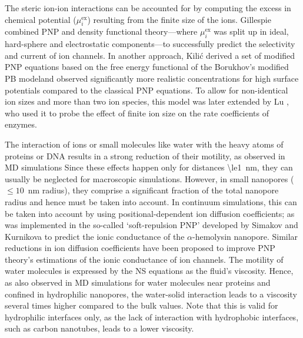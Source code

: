 \documentclass[journal=ancac3,manuscript=article,etalmode=truncate,maxauthors=0,layout=onecolumn]{achemso}
\begin{document}
The steric ion-ion interactions can be accounted for by computing the excess in
chemical potential ($\mu_{i}^\text{ex}$) resulting from the finite size of the
ions.\cite{Eisenberg-1996,Bazant-2009, Daiguji-2010} Gillespie \etal{} combined
PNP and density functional theory---where $\mu_{i}^\text{ex}$ was split up in
ideal, hard-sphere and electrostatic components---to successfully predict the
selectivity and current of ion channels.\cite{Gillespie-2002} In another
approach, Kili\'{c} \etal{} derived a set of modified PNP equations based on the
free energy functional of the Borukhov's modified PB
model\cite{Borukhov-1997}and observed significantly more realistic
concentrations for high surface potentials compared to the classical PNP
equations.\cite{Kilic-2007} To allow for non-identical ion sizes and more than
two ion species, this model was later extended by Lu \etal{}, who used it to
probe the effect of finite ion size on the rate coefficients of
enzymes.\cite{Lu-2011}

The interaction of ions or small molecules like water with the heavy atoms of
proteins or DNA results in a strong reduction of their motility, as observed in
MD simulations\cite{Makarov-1998,Pronk-2014} Since these effects happen only for
distances \SI{\le1}{\nm}, they can usually be neglected for macroscopic
simulations. However, in small nanopores ($\le10$~nm radius), they comprise a
significant fraction of the total nanopore radius and hence must be taken into
account.\cite{Noskov-2004,Simakov-2010,Pederson-2015,McMullen-2017} In continuum
simulations, this can be taken into account by using positional-dependent ion
diffusion coefficients; as was implemented in the so-called `soft-repulsion PNP'
developed by Simakov and Kurnikova\cite{Simakov-2010, Simakov-2018} to predict
the ionic conductance of the $\alpha$-hemolysin nanopore. Similar reductions in
ion diffusion coefficients have been proposed to improve PNP theory's
estimations of the ionic conductance of ion channels.\cite{Furini-2006,Liu-2015}
The motility of water molecules is expressed by the NS equations as the fluid's
viscosity. Hence, as also observed in MD simulations for water molecules near
proteins\cite{Pronk-2014} and confined in hydrophilic
nanopores,\cite{Qiao_Aluru-2003,Vo-2016,Hsu-2017} the water-solid interaction
leads to a viscosity several times higher compared to the bulk values. Note that
this is valid for hydrophilic interfaces only, as the lack of interaction with
hydrophobic interfaces, such as carbon nanotubes, leads to a lower
viscosity.\cite{Ye-2011}
\end{document}
